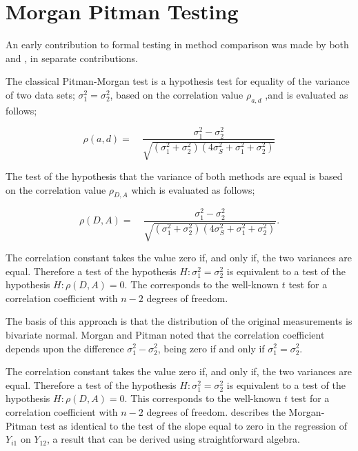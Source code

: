 \documentclass[12pt, a4paper]{report}
\theoremstyle{plain}
\theoremstyle{definition}
\theoremstyle{remark}
\begin{document}
	
	
	
	
	
	
	
	\section{Morgan Pitman Testing}
	An early contribution to formal testing in method comparison was
	made by both \citet{morgan} and \citet{pitman}, in separate
	contributions. 	
	
	The classical Pitman-Morgan test is a hypothesis test for equality
	of the variance of two data sets; $\sigma^{2}_{1} =
	\sigma^{2}_{2}$, based on the correlation value $\rho_{a,d}$ ,and
	is evaluated as follows;
	
	\begin{equation}
	\rho(a,d)=\quad\frac{\sigma^{2}_{1}-\sigma^{2}_{2}}{\sqrt{(\sigma^{2}_{1}+\sigma^{2}_{2})(4\sigma^{2}_{S}+\sigma^{2}_{1}+\sigma^{2}_{2})}}
	\end{equation}
	
	The test of the hypothesis that the variance of both methods are
	equal is based on the correlation value $\rho_{D,A}$ which is
	evaluated as follows;
	
	\begin{equation}
	\rho(D,A)=\quad\frac{\sigma^{2}_{1}-\sigma^{2}_{2}}{\sqrt{(\sigma^{2}_{1}+\sigma^{2}_{2})(4\sigma^{2}_{S}+\sigma^{2}_{1}+\sigma^{2}_{2})}}.
	\end{equation}
	
	The correlation constant takes the value zero if, and only if, the
	two variances are equal. Therefore a test of the hypothesis $H:
	\sigma^{2}_{1}=\sigma^{2}_{2}$ is equivalent to a test of the
	hypothesis $H: \rho(D,A) = 0$. The corresponds to the well-known
	$t$ test for a correlation coefficient with $n-2$ degrees of
	freedom.
	
	The basis of this approach is that the
	distribution of the original measurements is bivariate normal.
	Morgan and Pitman noted that the correlation coefficient depends
	upon the difference $\sigma^{2}_{1}- \sigma^{2}_{2}$, being zero
	if and only if $\sigma^{2}_{1}=\sigma^{2}_{2}$.
	
	
	The correlation constant takes the value zero if, and only if, the two variances are equal. Therefore a test of the hypothesis $H: \sigma^{2}_{1}=\sigma^{2}_{2}$ is equivalent to a test of the hypothesis $H: \rho(D,A) = 0$. This corresponds to the well-known
	$t$ test for a correlation coefficient with $n-2$ degrees of freedom. \citet{Bartko} describes the Morgan-Pitman test as identical to
	the test of the slope equal to zero in the regression of $Y_{i1}$ on $Y_{12}$, a result that can be derived using
	straightforward algebra.
	
\end{document}
